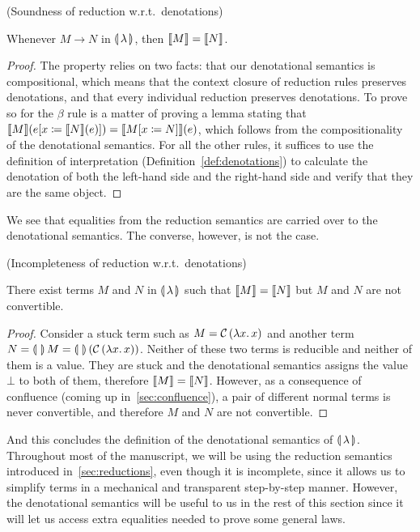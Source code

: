 \begin{property}\label{prop:denotation-soundness}
  (Soundness of reduction w.r.t.\ denotations)

  Whenever $M \to N$ in $\llparenthesis \, \lambda \, \rrparenthesis$, then $\llbracket M \rrbracket = \llbracket N \rrbracket$.
\end{property}

\begin{proof}
  The property relies on two facts: that our denotational semantics is
  compositional, which means that the context closure of reduction rules
  preserves denotations, and that every individual reduction preserves
  denotations. To prove so for the $\beta$ rule is a matter of proving a
  lemma stating that
  $\llbracket M \rrbracket(e[x \coloneqq \llbracket N \rrbracket(e)]) = \llbracket M[x \coloneqq N] \rrbracket(e)$, which
  follows from the compositionality of the denotational semantics. For all
  the other rules, it suffices to use the definition of interpretation
  (Definition~\ref{def:denotations}) to calculate the denotation of both
  the left-hand side and the right-hand side and verify that they are the
  same object.
\end{proof}

We see that equalities from the reduction semantics are carried over to the
denotational semantics. The converse, however, is not the case.

\begin{observation}
  (Incompleteness of reduction w.r.t.\ denotations)
  
  There exist terms $M$ and $N$ in $\llparenthesis \, \lambda \, \rrparenthesis$ such that
  $\llbracket M \rrbracket = \llbracket N \rrbracket$ but $M$ and $N$ are not convertible.
\end{observation}

\begin{proof}
  Consider a stuck term such as $M = \mathcal{C}\,(\lambda x.\, x)$ and another
  term $N = \llparenthesis \,  \, \rrparenthesis\,M =
  \llparenthesis \,  \, \rrparenthesis\,(\mathcal{C}\,(\lambda x.\, x))$. Neither of these two terms is
  reducible and neither of them is a value. They are stuck and the
  denotational semantics assigns the value $\bot$ to both of them,
  therefore $\llbracket M \rrbracket = \llbracket N \rrbracket$. However, as a consequence of confluence
  (coming up in~\ref{sec:confluence}), a pair of different normal terms is
  never convertible, and therefore $M$ and $N$ are not convertible.
\end{proof}

And this concludes the definition of the denotational semantics of
$\llparenthesis \, \lambda \, \rrparenthesis$. Throughout most of the manuscript, we will be using the
reduction semantics introduced in~\ref{sec:reductions}, even though it is
incomplete, since it allows us to simplify terms in a mechanical and
transparent step-by-step manner. However, the denotational semantics will
be useful to us in the rest of this section since it will let us access
extra equalities needed to prove some general laws.


